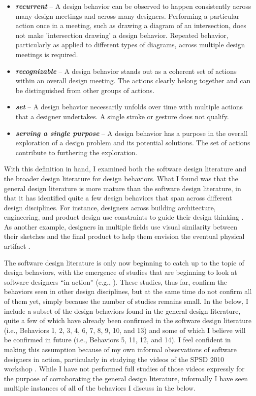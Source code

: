 \documentclass[12pt,fleqn]{ucithesis}
\begin{document}
\begin{itemize}
\item \textbf{\emph{recurrent}} -- A design behavior can be observed to happen consistently across many design meetings and across many designers. Performing a particular action once in a meeting, such as drawing a diagram of an intersection, does not make 'intersection drawing' a design behavior.  Repeated behavior, particularly as applied to different types of diagrams, across multiple design meetings is required. 
\item \textbf{\emph{recognizable}} -- A design behavior stands out as a coherent set of actions within an overall design meeting. The actions clearly belong together and can be distinguished from other groups of actions.
\item \textbf{\emph{set}} -- A design behavior necessarily unfolds over time with multiple actions that a designer undertakes. A single stroke or gesture does not qualify. 
\item \textbf{\emph{serving a single purpose}} -- A design behavior has a purpose in the overall exploration of a design problem and its potential solutions. The set of actions contribute to furthering the exploration.  
\end{itemize}

With this definition in hand, I examined both the software design literature and the broader design literature for design behaviors. What I found was that the general design literature is more mature than the software design literature, in that it has identified quite a few design behaviors that span across different design disciplines. For instance, designers across building architecture, engineering, and product design use constraints to guide their design thinking \cite{cross2007designerly}. As another example, designers in multiple fields use visual similarity between their sketches and the final product to help them envision the eventual physical artifact \cite{do1998right}.

The software design literature is only now beginning to catch up to the topic of design behaviors, with the emergence of studies that are beginning to look at software designers ``in action'' (e.g., \cite{baker2012guest,cherubini2007let,dekel2007notation,petre2009insights}). These studies, thus far, confirm the behaviors seen in other design disciplines, but at the same time do not confirm all of them yet, simply because the number of studies remains small. In the below, I include a subset of the design behaviors found in the general design literature, quite a few of which have already been confirmed in the software design literature (i.e., Behaviors 1, 2, 3, 4, 6, 7, 8, 9, 10, and 13) and some of which I believe will be confirmed in future (i.e., Behaviors 5, 11, 12, and 14). I feel confident in making this assumption because of my own informal observations of software designers in action, particularly in studying the videos of the SPSD 2010 workshop \cite{baker2012guest}. While I have not performed full studies of those videos expressly for the purpose of corroborating the general design literature, informally I have seen multiple instances of all of the behaviors I discuss in the below. 
\end{document}
